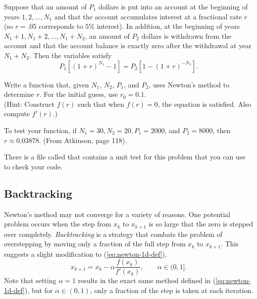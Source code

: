 \begin{problem} %
\label{prob:newton-interest}
Suppose that an amount of $P_1$ dollars is put into an account at the beginning of years $1, 2,..., N_1$ and that the account accumulates interest at a fractional rate $r$ (so $r = .05$ corresponds to $5\%$ interest).
In addition, at the beginning of years $N_1 + 1, N_1 + 2, ..., N_1 + N_2$, an amount of $P_2$ dollars is withdrawn from the account and that the account balance is exactly zero after the withdrawal at year $N_1 + N_2$.
Then the variables satisfy
\[
P_1[(1+r)^{N_1} - 1] = P_2[1-(1+r)^{-N_2}].
\]

Write a function that, given $N_1$, $N_2$, $P_1$, and $P_2$, uses Newton's method to determine $r$.
For the initial guess, use $r_0 = 0.1$.
\\(Hint: Construct $f(r)$ such that when $f(r)=0$, the equation is satisfied.
Also compute $f'(r)$.)

To test your function, if $N_1 =30, N_2 =20, P_1 =2000$, and $P_2 =8000$, then $r\approx 0.03878$.
(From Atkinson, page 118). %

There is a file called  that contains a unit test for this problem that you can use to check your code.
\end{problem}

\subsection*{Backtracking} %

Newton's method may not converge for a variety of reasons.
One potential problem occurs when the step from $x_k$ to $x_{k+1}$ is so large that the zero is stepped over completely.
\emph{Backtracking} is a strategy that combats the problem of overstepping by moving only a fraction of the full step from $x_k$ to $x_{k+1}$.
This suggests a slight modification to (\ref{eq:newton-1d-def}),
\begin{equation}
x_{k+1} = x_k - \alpha\frac{f(x_k)}{f'(x_k)},\qquad\alpha\in(0,1].
\label{eq:newton-backtracking-1d}
\end{equation}
Note that setting $\alpha = 1$ results in the exact same method defined in (\ref{eq:newton-1d-def}), but for $\alpha \in (0,1)$, only a fraction of the step is taken at each iteration.

